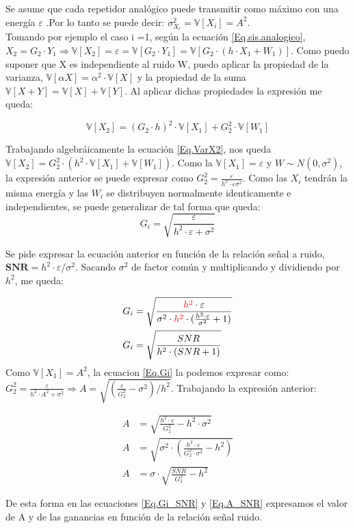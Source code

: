 \indent Se asume que cada repetidor analógico puede transmitir como máximo con una energía $\varepsilon$ .Por lo tanto se puede decir: $\sigma _{X_i}^{2} = \mathbb{V}[X_i] = A^2$. \\
\indent Tomando por ejemplo el caso i =1, según la ecuación \ref{Eq.sis.analogico}, $X_2 = G_2 \cdot Y_1  \Rightarrow \mathbb{V}[X_2] = \varepsilon = \mathbb{V}[G_2 \cdot Y_1] = \mathbb{V}[G_2 \cdot (h \cdot X_1 + W_1)]$. Como puedo suponer que X es independiente al ruido W, puedo aplicar la propiedad de la varianza, $\mathbb{V}[\alpha X]= \alpha^2 \cdot \mathbb{V}[X]$ y la propiedad de la suma $\mathbb{V}[X+Y] = \mathbb{V}[X]+ \mathbb{V}[Y]$. Al aplicar dichas propiedades la expresión me queda:

				\begin{equation}
					\mathbb{V}[X_2] =(G_2 \cdot h)^2 \cdot \mathbb{V} [X_1] + G_2^2 \cdot \mathbb{V}[ W_1]
				\label{Eq.VarX2}
				\end{equation}  
	
\indent Trabajando algebráicamente la ecuación \ref{Eq.VarX2}, nos queda $\mathbb{V}[X_2] = G_2^2 \cdot (h^2 \cdot \mathbb{V}[X_1] + \mathbb{V}[W_1])$. Como la $\mathbb{V}[X_1] = \varepsilon$ y $W \sim N(0,\sigma ^2)$, la expresión anterior se puede expresar como $G_2^2 = \frac{\varepsilon}{h^2 \cdot \varepsilon \sigma ^2}$. Como las $X_i$ tendrán la misma energía y las $W_i$ se distribuyen normalmente identicamente e independientes, se puede generalizar de tal forma que queda:
				\begin{equation}
					G_i = \sqrt{\frac{\varepsilon}{h^2 \cdot \varepsilon + \sigma ^2}}
				\label{Eq.Gi}
				\end{equation}

Se pide expresar la ecuación anterior en función de la relación señal a ruido, $\textbf{SNR} = h^2 \cdot \varepsilon / \sigma ^2$. Sacando $\sigma ^2$ de factor común y multiplicando y dividiendo por $h^2$, me queda:
			
				\begin{align}
					G_i &= \sqrt{\frac{\textcolor{red}{h^2} \cdot \varepsilon}{\sigma ^2 \cdot \textcolor{red}{h^2} \cdot (\frac{h^2 \cdot \varepsilon}{\sigma ^2} + 1)}} \\
					G_i &= \sqrt{\frac{SNR}{h^2 \cdot (SNR + 1)}}
					\label{Eq.Gi_SNR}
				\end{align}
Como $\mathbb{V}[X_1] = A^2$, la ecuacion \ref{Eq.Gi} la podemos expresar como: $G_2 ^2 = \frac{\varepsilon}{h^2 \cdot A^2 + \sigma ^2} \Rightarrow A = \sqrt{(\frac{\varepsilon}{G_2^2}-\sigma ^2)/h^2}$. Trabajando la expresión anterior:

				\begin{align}
					A &= \sqrt{\frac{h^2 \cdot \varepsilon}{G_2^2}- h^2 \cdot \sigma ^2} \\	
					A &= \sqrt{\sigma ^2 \cdot (\frac{h^2 \cdot \varepsilon}{G_2^2 \cdot \sigma ^2}- h^2)} \\
					A &= \sigma \cdot \sqrt{\frac{SNR}{G_2^2}-h^2}
					\label{Eq.A_SNR}
				\end{align}
			
\indent De esta forma en las ecuaciones \ref{Eq.Gi_SNR} y \ref{Eq.A_SNR} expresamos el valor de A y de las ganancias en función de la relación señal ruido.
